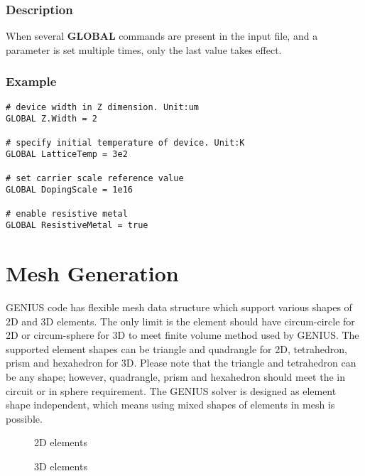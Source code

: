 \documentclass[oneside,12pt]{cgd_book}
\begin{document}
\subsubsection{Description}
When several $\mathbf{GLOBAL}$ commands are present in the input file, and a parameter is set
          multiple times, only the last value takes effect.
\par
\subsubsection{Example}
\begin{lstlisting}[style=GeniusCode]
# device width in Z dimension. Unit:um
GLOBAL Z.Width = 2

# specify initial temperature of device. Unit:K
GLOBAL LatticeTemp = 3e2

# set carrier scale reference value
GLOBAL DopingScale = 1e16

# enable resistive metal
GLOBAL ResistiveMetal = true
\end{lstlisting}
\section{Mesh Generation}
GENIUS code has flexible mesh data structure which support various shapes of 2D and 3D elements. The only
      limit is the element should have circum-circle for 2D or circum-sphere for 3D to meet finite volume method used by
      GENIUS. The supported element shapes can be triangle and quadrangle for 2D, tetrahedron, prism and hexahedron for
      3D. Please note that the triangle and tetrahedron can be any shape; however, quadrangle, prism and hexahedron
      should meet the in circuit or in sphere requirement. The GENIUS solver is designed as element shape independent,
      which means using mixed shapes of elements in mesh is possible.
\par
\begin{figure}[H]
\caption{\label{fig:CmdRef:2dElemnt}2D elements}
\end{figure}

\begin{figure}[H]
\caption{\label{fig:CmdRef:3dElemnt}3D elements}
\end{figure}
\end{document}
